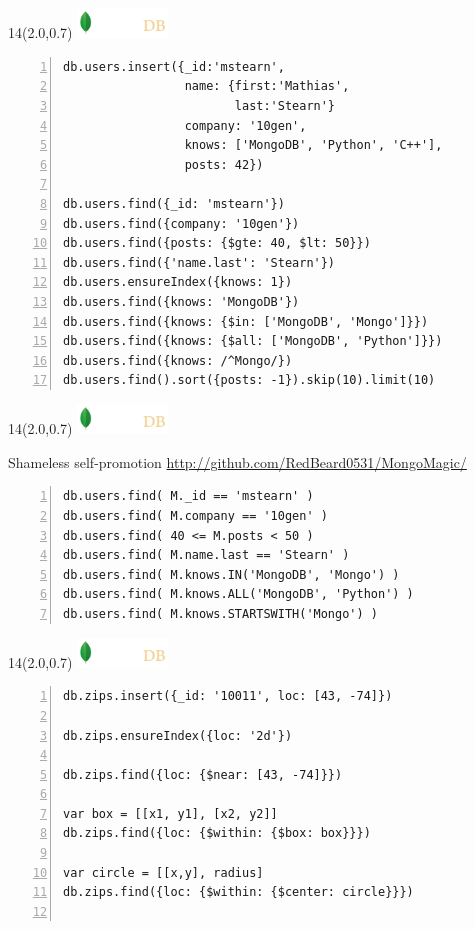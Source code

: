 \documentclass{beamer}
\newcommand{\MongoLogo}{
\begin{textblock}{14}(2.0,0.7)
  \includegraphics[height=0.8cm]{logo-mongodb-ondark.png}
\end{textblock}
}
\begin{document}
\begin{frame}[fragile]
  \MongoLogo

  \small
  \begin{lstlisting}[numbers=left, numberstyle=\tiny\color{red}]
db.users.insert({_id:'mstearn',
                 name: {first:'Mathias',
                        last:'Stearn'}
                 company: '10gen',
                 knows: ['MongoDB', 'Python', 'C++'],
                 posts: 42})
                 
db.users.find({_id: 'mstearn'})
db.users.find({company: '10gen'})
db.users.find({posts: {$gte: 40, $lt: 50}}) 
db.users.find({'name.last': 'Stearn'})
db.users.ensureIndex({knows: 1})
db.users.find({knows: 'MongoDB'})
db.users.find({knows: {$in: ['MongoDB', 'Mongo']}})
db.users.find({knows: {$all: ['MongoDB', 'Python']}})
db.users.find({knows: /^Mongo/})
db.users.find().sort({posts: -1}).skip(10).limit(10)
  \end{lstlisting}
\end{frame}


\begin{frame}[fragile]
  \MongoLogo

  \begin{block}{Shameless self-promotion}
    \url{http://github.com/RedBeard0531/MongoMagic/}
  \end{block}

  \begin{lstlisting}[numbers=left, numberstyle=\tiny\color{red}]
db.users.find( M._id == 'mstearn' )
db.users.find( M.company == '10gen' )
db.users.find( 40 <= M.posts < 50 ) 
db.users.find( M.name.last == 'Stearn' )
db.users.find( M.knows.IN('MongoDB', 'Mongo') )
db.users.find( M.knows.ALL('MongoDB', 'Python') )
db.users.find( M.knows.STARTSWITH('Mongo') )
  \end{lstlisting}
\end{frame}
\begin{frame}[fragile]
  \MongoLogo

  \small
  \begin{lstlisting}[numbers=left, numberstyle=\tiny\color{red}]
db.zips.insert({_id: '10011', loc: [43, -74]})

db.zips.ensureIndex({loc: '2d'})

db.zips.find({loc: {$near: [43, -74]}})

var box = [[x1, y1], [x2, y2]]
db.zips.find({loc: {$within: {$box: box}}})

var circle = [[x,y], radius]
db.zips.find({loc: {$within: {$center: circle}}})
                 
  \end{lstlisting}
\end{frame}
\end{document}
